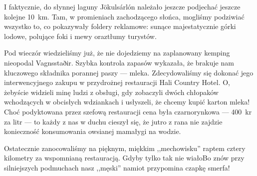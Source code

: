 I faktycznie, do słynnej laguny Jökulsárlón należało jeszcze podjechać jeszcze kolejne 10~km. Tam, w promieniach zachodzącego słońca, mogliśmy podziwiać wszystko to, co pokazywały foldery reklamowe: sunące majestatycznie górki lodowe, polujące foki i mewy oraz\textellipsis tłumy turystów.

Pod wieczór wiedzieliśmy już, że nie dojedziemy na zaplanowany kemping nieopodal Vagnsstaðir. Szybka kontrola zapasów wykazała, że brakuje nam kluczowego składnika porannej paszy --- mleka. Zdecydowaliśmy się dokonać jego interwencyjnego zakupu w przydrożnej restauracji Hali Country Hotel. O, żebyście widzieli minę ludzi z obsługi, gdy zobaczyli dwóch chłopaków wchodzących w obcisłych wdziankach i usłyszeli, że chcemy kupić karton mleka! Choć podyktowana przez szefową restauracji cena była czarnorynkowa --- 400~kr za litr --- to każdy z nas w duchu cieszył się, że jutro z rana nie zajdzie konieczność konsumowania owsianej mamałygi na wodzie.

Ostatecznie zanocowaliśmy na pięknym, miękkim ,,mechowisku'' raptem cztery kilometry za wspomnianą restauracją. Gdyby tylko tak nie wiało\textellipsis Bo znów przy silniejszych podmuchach nasz ,,męski'' namiot przypomina czapkę smerfa!